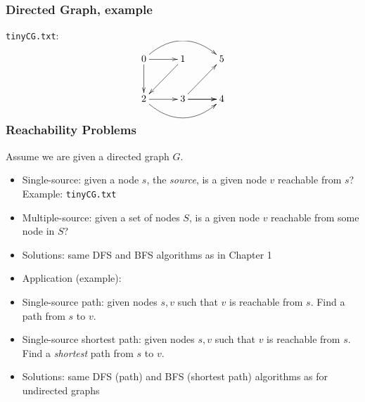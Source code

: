 \documentclass[handout]{beamer}
\begin{document}
\begin{frame}
    \frametitle{Directed Graph, example}

{\tt tinyCG.txt}:

\[
\xymatrix@R=1cm@C=1cm{
0 \ar[d] \ar[r] \ar@(ur,ul)[rr]& 1\ar[ld] &5 \\
2 \ar[r] \ar@(dr,dl)[rr]  & 3 \ar[r] \ar[ur]\ar[r] & 4 
}
\]
\end{frame}

\begin{frame}
    \frametitle{Reachability Problems}
    Assume we are given a directed graph $G$.

\begin{itemize}[<+->]

\item Single-source: given a node $s$, the \emph{source}, 
is a given node $v$ reachable from $s$? Example: {\tt tinyCG.txt}
\item Multiple-source: given a set of nodes $S$, is a given node $v$ reachable from some node in $S$?
\item Solutions: same DFS and BFS algorithms as in Chapter 1
\item Application (example): 
\href{https://en.wikipedia.org/wiki/Tracing_garbage_collection}%
{\color{red}{mark-and-sweep garbage collection}}
\item Single-source path:  given nodes $s,v$ such that $v$ is reachable from $s$.
      Find a path from $s$ to $v$.
\item Single-source shortest path: given nodes $s,v$ such that $v$ is reachable from $s$.
      Find a \emph{shortest} path from $s$ to $v$.
\item Solutions: same DFS (path) and BFS (shortest path) algorithms as for undirected graphs
\end{itemize}
\end{frame}
\end{document}
